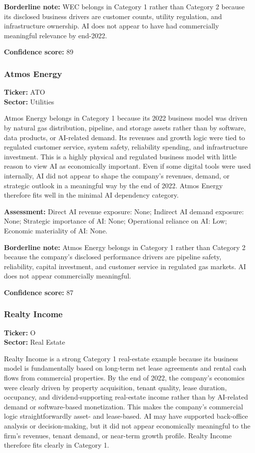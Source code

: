 \documentclass{article}
\begin{document}
\textbf{Borderline note:} WEC belongs in Category 1 rather than Category 2 because its disclosed business drivers are customer counts, utility regulation, and infrastructure ownership. AI does not appear to have had commercially meaningful relevance by end-2022.

\textbf{Confidence score:} 89

\subsubsection*{Atmos Energy}
\textbf{Ticker:} ATO \\
\textbf{Sector:} Utilities

Atmos Energy belongs in Category 1 because its 2022 business model was driven by natural gas distribution, pipeline, and storage assets rather than by software, data products, or AI-related demand. Its revenues and growth logic were tied to regulated customer service, system safety, reliability spending, and infrastructure investment. This is a highly physical and regulated business model with little reason to view AI as economically important. Even if some digital tools were used internally, AI did not appear to shape the company’s revenues, demand, or strategic outlook in a meaningful way by the end of 2022. Atmos Energy therefore fits well in the minimal AI dependency category.

\textbf{Assessment:} Direct AI revenue exposure: None; Indirect AI demand exposure: None; Strategic importance of AI: None; Operational reliance on AI: Low; Economic materiality of AI: None.

\textbf{Borderline note:} Atmos Energy belongs in Category 1 rather than Category 2 because the company’s disclosed performance drivers are pipeline safety, reliability, capital investment, and customer service in regulated gas markets. AI does not appear commercially meaningful.

\textbf{Confidence score:} 87

\subsubsection*{Realty Income}
\textbf{Ticker:} O \\
\textbf{Sector:} Real Estate

Realty Income is a strong Category 1 real-estate example because its business model is fundamentally based on long-term net lease agreements and rental cash flows from commercial properties. By the end of 2022, the company’s economics were clearly driven by property acquisition, tenant quality, lease duration, occupancy, and dividend-supporting real-estate income rather than by AI-related demand or software-based monetization. This makes the company’s commercial logic straightforwardly asset- and lease-based. AI may have supported back-office analysis or decision-making, but it did not appear economically meaningful to the firm’s revenues, tenant demand, or near-term growth profile. Realty Income therefore fits clearly in Category 1.
\end{document}
